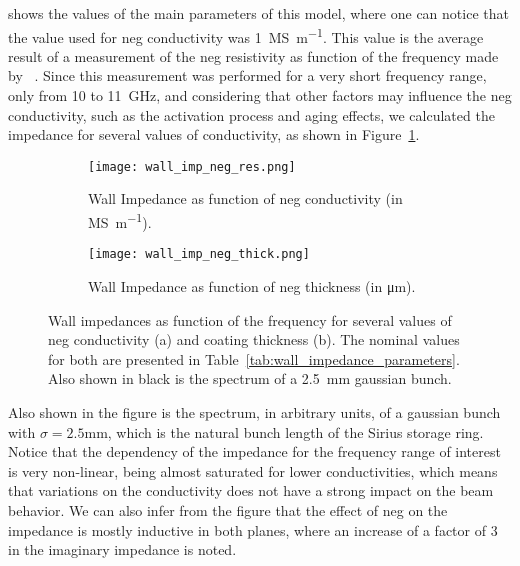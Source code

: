     shows the values of the main parameters of this model, where one can notice that the value used for \gls{neg} conductivity was \SI{1}{\mega\siemens\per\meter}. This value is the average result of a measurement of the \gls{neg} resistivity as function of the frequency made by ~. Since this measurement was performed for a very short frequency range, only from \SI{10}{} to \SI{11}{\giga\hertz}, and considering that other factors may influence the \gls{neg} conductivity, such as the activation process and aging effects, we calculated the impedance for several values of conductivity, as shown in Figure~\ref{fig:wall_impedance_neg_res}.
    \begin{figure}
        \def \mysize {\textwidth}
        \centering
        \begin{subfigure}[c]{\textwidth}
            \centering
            \texttt{[image: wall\_imp\_neg\_res.png]}
            \caption{Wall Impedance as function of \gls{neg} conductivity (in \si{\mega\siemens\per\meter}).}
            \label{fig:wall_impedance_neg_res}
        \end{subfigure}
        \begin{subfigure}[c]{\textwidth}
            \centering
            \texttt{[image: wall\_imp\_neg\_thick.png]}
            \caption{Wall Impedance as function of \gls{neg} thickness (in \si{\micro\meter}).}
            \label{fig:wall_impedance_neg_thick}
        \end{subfigure}
        \caption[Neg effect on impedance.]{Wall impedances as function of the frequency for several values of \gls{neg} conductivity (a) and coating thickness (b). The nominal values for both are presented in Table~\ref{tab:wall_impedance_parameters}. Also shown in black is the spectrum of a \SI{2.5}{\milli\meter} gaussian bunch.}
        \label{fig:wall_impedance_neg}
    \end{figure}
    Also shown in the figure is the spectrum, in arbitrary units, of a gaussian bunch with $\sigma=2.5$\si{\milli\meter}, which is the natural bunch length of the Sirius storage ring. Notice that the dependency of the impedance for the frequency range of interest is very non-linear, being almost saturated for lower conductivities, which means that variations on the conductivity does not have a strong impact on the beam behavior. We can also infer from the figure that the effect of \gls{neg} on the impedance is mostly inductive in both planes, where an increase of a factor of \SI{3}{} in the imaginary impedance is noted.

